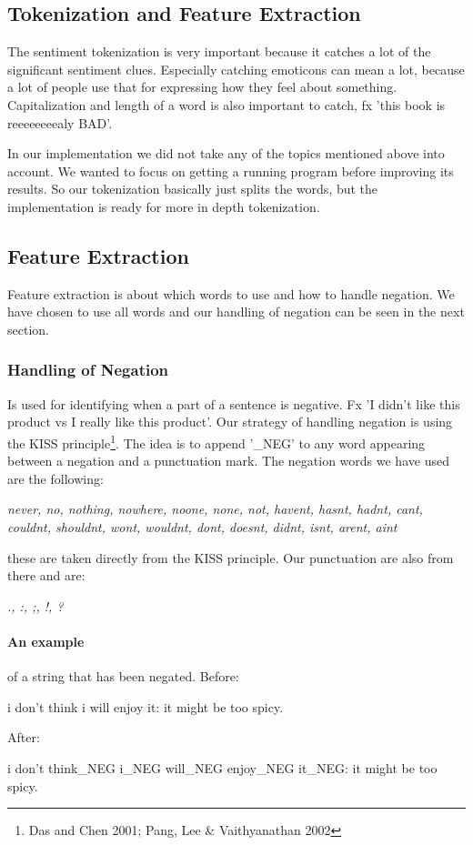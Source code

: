 \subsection{Tokenization and Feature Extraction}
The sentiment tokenization is very important because it catches a lot of the significant sentiment clues.
Especially catching emoticons can mean a lot, because a lot of people use that for expressing how they feel about something.
Capitalization and length of a word is also important to catch, fx 'this book is reeeeeeeealy BAD'.

In our implementation we did not take any of the topics mentioned above into account.
We wanted to focus on getting a running program before improving its results.
So our tokenization basically just splits the words, but the implementation is ready for more in depth tokenization.

\subsection{Feature Extraction}
Feature extraction is about which words to use and how to handle negation.
We have chosen to use all words and our handling of negation can be seen in the next section.

\subsubsection{Handling of Negation}
Is used for identifying when a part of a sentence is negative.
Fx 'I didn't like this product vs I really like this product'.
Our strategy of handling negation is using the KISS principle\footnote{Das and Chen 2001; Pang, Lee \& Vaithyanathan 2002}.
The idea is to append '\_NEG' to any word appearing between a negation and a punctuation mark.
The negation words we have used are the following:
\begin{center}
 \it{never, no, nothing, nowhere, noone, none, not, havent, hasnt, hadnt, cant, couldnt, shouldnt, wont, wouldnt, dont, doesnt, didnt, isnt, arent, aint}
\end{center}
these are taken directly from the KISS principle.
Our punctuation are also from there and are:
\begin{center}
 \it{., :, ;, !, ?}
\end{center}

\paragraph{An example} of a string that has been negated. Before:
\begin{center}
 i don't think i will enjoy it: it might be too spicy.
\end{center}
After:
\begin{center}
 i don't think\_NEG i\_NEG will\_NEG enjoy\_NEG it\_NEG: it might be too spicy.
\end{center}
